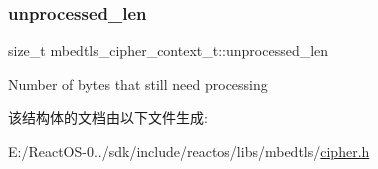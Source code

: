 \subsubsection{\texorpdfstring{unprocessed\+\_\+len}{unprocessed\_len}}
{\footnotesize\ttfamily size\+\_\+t mbedtls\+\_\+cipher\+\_\+context\+\_\+t\+::unprocessed\+\_\+len}

Number of bytes that still need processing 

该结构体的文档由以下文件生成\+:\begin{DoxyCompactItemize}
\item 
E\+:/\+React\+O\+S-\/0../sdk/include/reactos/libs/mbedtls/\hyperlink{cipher_8h}{cipher.\+h}\end{DoxyCompactItemize}
